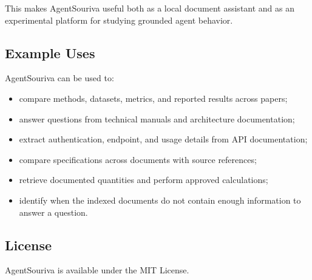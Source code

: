 This makes AgentSouriva useful both as a local document assistant and as an experimental platform for studying grounded agent behavior.

\subsection{Example Uses}

AgentSouriva can be used to:

\begin{itemize}
\tightlist
\item
  compare methods, datasets, metrics, and reported results across papers;
\item
  answer questions from technical manuals and architecture documentation;
\item
  extract authentication, endpoint, and usage details from API documentation;
\item
  compare specifications across documents with source references;
\item
  retrieve documented quantities and perform approved calculations;
\item
  identify when the indexed documents do not contain enough information to answer a question.
\end{itemize}

\subsection{License}

AgentSouriva is available under the MIT License.

